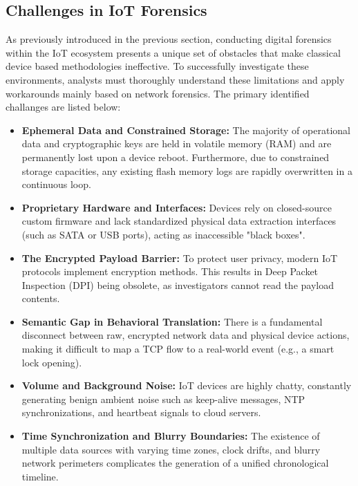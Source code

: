\subsection{Challenges in IoT Forensics}
As previously introduced in the previous section, conducting digital forensics within the IoT ecosystem presents a unique set of obstacles that make classical device based methodologies ineffective. To successfully investigate these environments, analysts must thoroughly understand these limitations and apply workarounds mainly based on network forensics. The primary identified challanges are listed below:

\begin{itemize}
	\item \textbf{Ephemeral Data and Constrained Storage:} The majority of operational data and cryptographic keys are held in volatile memory (RAM) and are permanently lost upon a device reboot. Furthermore, due to constrained storage capacities, any existing flash memory logs are rapidly overwritten in a continuous loop. 

	\item \textbf{Proprietary Hardware and Interfaces:} Devices rely on closed-source custom firmware and lack standardized physical data extraction interfaces (such as SATA or USB ports), acting as inaccessible "black boxes".
	
	\item \textbf{The Encrypted Payload Barrier:} To protect user privacy, modern IoT protocols implement encryption methods. This results in Deep Packet Inspection (DPI) being obsolete, as investigators cannot read the payload contents.
	
	\item \textbf{Semantic Gap in Behavioral Translation:} There is a fundamental disconnect between raw, encrypted network data and physical device actions, making it difficult to map a TCP flow to a real-world event (e.g., a smart lock opening). 
	
	\item \textbf{Volume and Background Noise:} IoT devices are highly chatty, constantly generating benign ambient noise such as keep-alive messages, NTP synchronizations, and heartbeat signals to cloud servers. 
	
	\item \textbf{Time Synchronization and Blurry Boundaries:} The existence of multiple data sources with varying time zones, clock drifts, and blurry network perimeters complicates the generation of a unified chronological timeline. 
	

\end{itemize}
